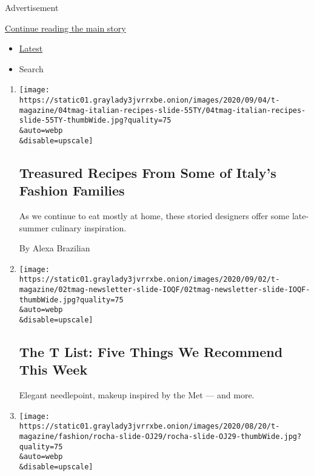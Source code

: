 Advertisement

\protect\hyperlink{after-mid1}{Continue reading the main story}

\begin{itemize}
\tightlist
\item
  \protect\hyperlink{stream-panel}{Latest}
\item
  Search
\end{itemize}

\begin{enumerate}
\def\labelenumi{\arabic{enumi}.}
\item
  \href{/2020/09/04/t-magazine/fashion-italian-recipes.html}{}

  \texttt{[image: https://static01.graylady3jvrrxbe.onion/images/2020/09/04/t-magazine/04tmag-italian-recipes-slide-55TY/04tmag-italian-recipes-slide-55TY-thumbWide.jpg?quality=75\\\&auto=webp\\\&disable=upscale]}

  \hypertarget{treasured-recipes-from-some-of-italys-fashion-families}{%
  \subsection{Treasured Recipes From Some of Italy's Fashion
  Families}\label{treasured-recipes-from-some-of-italys-fashion-families}}

  As we continue to eat mostly at home, these storied designers offer
  some late-summer culinary inspiration.

  By Alexa Brazilian
\item
  \href{/2020/09/03/t-magazine/ollies-pizza-estee-lauder-met.html}{}

  \texttt{[image: https://static01.graylady3jvrrxbe.onion/images/2020/09/02/t-magazine/02tmag-newsletter-slide-IOQF/02tmag-newsletter-slide-IOQF-thumbWide.jpg?quality=75\\\&auto=webp\\\&disable=upscale]}

  \hypertarget{the-t-list-five-things-we-recommend-this-week}{%
  \subsection{The T List: Five Things We Recommend This
  Week}\label{the-t-list-five-things-we-recommend-this-week}}

  Elegant needlepoint, makeup inspired by the Met --- and more.
\item
  \href{/2020/09/01/t-magazine/simone-max-rocha-family.html}{}

  \texttt{[image: https://static01.graylady3jvrrxbe.onion/images/2020/08/20/t-magazine/fashion/rocha-slide-OJ29/rocha-slide-OJ29-thumbWide.jpg?quality=75\\\&auto=webp\\\&disable=upscale]}


\end{enumerate}
